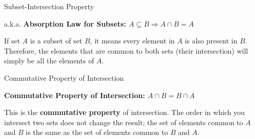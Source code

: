 \documentclass[11pt,aspectratio=1610]{beamer}
\begin{document}
\begin{frame}{Subset-Intersection Property}
	\begin{center}
		a.k.a. \textbf{Absorption Law for Subsets: $A \subseteq B \Rightarrow A \cap B = A$}
	\end{center}
	\vspace{0.2cm}
	If set $A$ is a subset of set $B$, it means every element in $A$ is also present in $B$. Therefore, the elements that are common to both sets (their intersection) will simply be all the elements of $A$.
	
	\begin{center}
	\end{center}
\end{frame}

\begin{frame}{Commutative Property of Intersection}
	\begin{center}
		\textbf{Commutative Property of Intersection: $A \cap B = B \cap A$}
	\end{center}
	\vspace{0.2cm}
	This is the \textbf{commutative property} of intersection. The order in which you intersect two sets does not change the result; the set of elements common to $A$ and $B$ is the same as the set of elements common to $B$ and $A$.
	
	\begin{center}
		\quad
	\end{center}
\end{frame}
\end{document}
